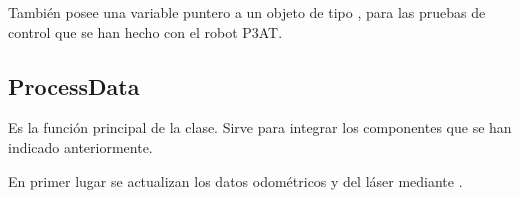 \noindent
También posee una variable puntero a un objeto de tipo , para las pruebas de control que se han hecho con el robot P3AT.


%
%
%
%
%
%
%
%
%
%

\subsection{ProcessData}

\noindent
{}

\noindent
Es la función principal de la clase. Sirve para integrar los componentes que se han indicado anteriormente.

\noindent
En primer lugar se actualizan los datos odométricos y del láser mediante .

